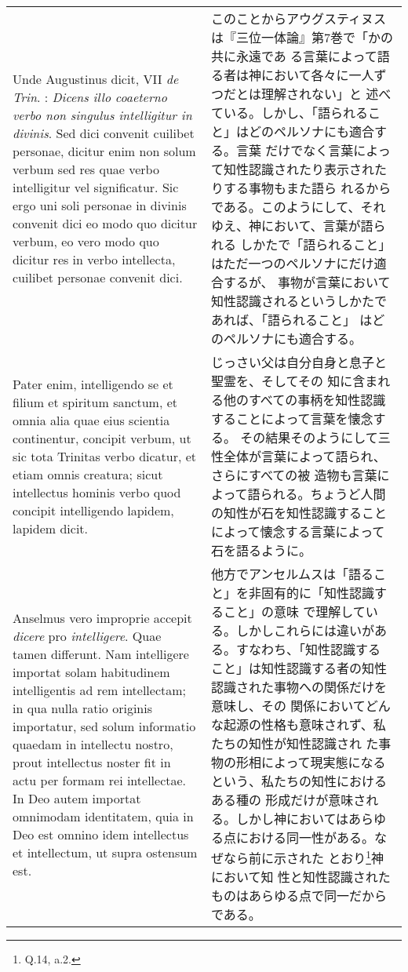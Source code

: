 \documentclass[10pt]{jsarticle} %
\begin{document}
\begin{longtable}{p{21em}p{21em}}
\\



Unde Augustinus dicit, VII {\itshape de Trin}. : {\itshape Dicens illo coaeterno
 verbo non singulus intelligitur in divinis}. Sed dici convenit
 cuilibet personae, dicitur enim non solum verbum sed res quae verbo
 intelligitur vel significatur. Sic ergo uni soli personae in divinis
 convenit dici eo modo quo dicitur verbum, eo vero modo quo dicitur
 res in verbo intellecta, cuilibet personae convenit dici. 

&

このことからアウグスティヌスは『三位一体論』第7巻で「かの共に永遠であ
 る言葉によって語る者は神において各々に一人ずつだとは理解されない」と
 述べている。しかし、「語られること」はどのペルソナにも適合する。言葉
 だけでなく言葉によって知性認識されたり表示されたりする事物もまた語ら
 れるからである。このようにして、それゆえ、神において、言葉が語られる
 しかたで「語られること」はただ一つのペルソナにだけ適合するが、
 事物が言葉において知性認識されるというしかたであれば、「語られること」
 はどのペルソナにも適合する。

\\



Pater enim,
 intelligendo se et filium et spiritum sanctum, et omnia alia quae
 eius scientia continentur, concipit verbum, ut sic tota Trinitas
 verbo dicatur, et etiam omnis creatura; sicut intellectus hominis
 verbo quod concipit intelligendo lapidem, lapidem dicit. 
&

じっさい父は自分自身と息子と聖霊を、そしてその
 知に含まれる他のすべての事柄を知性認識することによって言葉を懐念する。
 その結果そのようにして三性全体が言葉によって語られ、さらにすべての被
 造物も言葉によって語られる。ちょうど人間の知性が石を知性認識すること
 によって懐念する言葉によって石を語るように。

\\

Anselmus
 vero improprie accepit {\itshape dicere} pro {\itshape intelligere}. 
Quae tamen
 differunt. Nam intelligere importat solam habitudinem intelligentis
 ad rem intellectam; in qua nulla ratio originis importatur, sed solum
 informatio quaedam in intellectu nostro, prout intellectus noster fit
 in actu per formam rei intellectae. In Deo autem importat omnimodam
 identitatem, quia in Deo est omnino idem intellectus et intellectum,
 ut supra ostensum est.

&

他方でアンセルムスは「語ること」を非固有的に「知性認識すること」の意味
 で理解している。しかしこれらには違いがある。すなわち、「知性認識する
 こと」は知性認識する者の知性認識された事物への関係だけを意味し、その
 関係においてどんな起源の性格も意味されず、私たちの知性が知性認識され
 た事物の形相によって現実態になるという、私たちの知性におけるある種の
 形成だけが意味される。しかし神においてはあらゆる点における同一性がある。なぜなら前に示された
 とおり\footnote{Q.14, a.2.}神において知
 性と知性認識されたものはあらゆる点で同一だからである。



\end{longtable}
\end{document}
